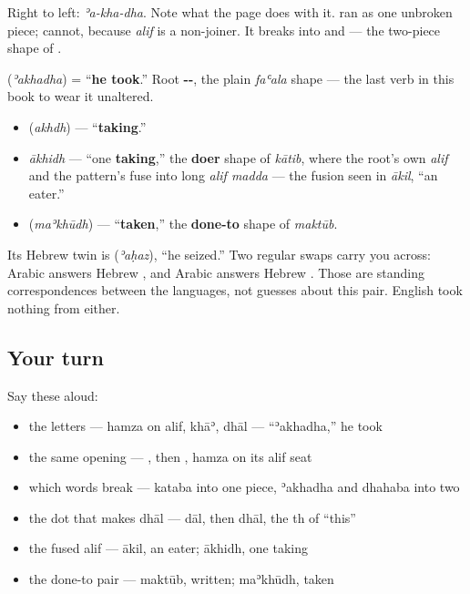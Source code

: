 Right to left: \emph{ʾa-kha-dha}. Note what the page does with it. \textbf{} ran as one unbroken piece; \textbf{} cannot, because \emph{alif} is a non-joiner. It breaks into \textbf{} and \textbf{} — the two-piece shape of \textbf{}.

\begin{cousinweb}
\textbf{} (\emph{ʾakhadha}) = \textquotedblleft{}\textbf{he took}.\textquotedblright{} Root \textbf{--}, the plain \emph{faʿala} shape — the last verb in this book to wear it unaltered.

\begin{itemize}
\raggedright
  \item \textbf{} (\emph{akhdh}) — \textquotedblleft{}\textbf{taking}.\textquotedblright{}
  \item \emph{ākhidh} — \textquotedblleft{}one \textbf{taking},\textquotedblright{} the \textbf{doer} shape of \emph{kātib}, where the root's own \emph{alif} and the pattern's fuse into long \emph{alif madda} — the fusion seen in \emph{ākil}, \textquotedblleft{}an eater.\textquotedblright{}
  \item \textbf{} (\emph{maʾkhūdh}) — \textquotedblleft{}\textbf{taken},\textquotedblright{} the \textbf{done-to} shape of \emph{maktūb}.
\end{itemize}

Its Hebrew twin is \textbf{} (\emph{ʾaḥaz}), \textquotedblleft{}he seized.\textquotedblright{} Two regular swaps carry you across: Arabic \textbf{} answers Hebrew \textbf{}, and Arabic \textbf{} answers Hebrew \textbf{}. Those are standing correspondences between the languages, not guesses about this pair. English took nothing from either.
\end{cousinweb}

\subsection*{Your turn}
Say these aloud:

\begin{itemize}
\raggedright
  \item the letters — hamza on alif, khāʾ, dhāl — \textquotedblleft{}ʾakhadha,\textquotedblright{} he took
  \item the same opening — , then , hamza on its alif seat
  \item which words break — kataba into one piece, ʾakhadha and dhahaba into two
  \item the dot that makes dhāl — dāl, then dhāl, the th of \textquotedblleft{}this\textquotedblright{}
  \item the fused alif — ākil, an eater; ākhidh, one taking
  \item the done-to pair — maktūb, written; maʾkhūdh, taken
\end{itemize}


